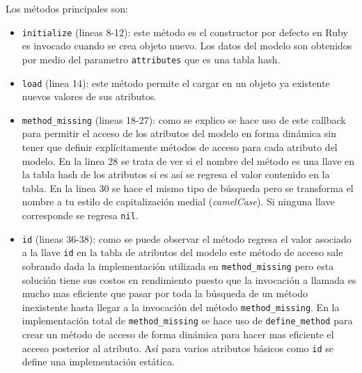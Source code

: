 Los métodos principales son:
\begin{itemize}
\item \texttt{initialize} (lineas 8-12): este método es el constructor por defecto
  en Ruby es invocado cuando se crea objeto nuevo. Los datos del modelo son obtenidos
  por medio del parametro \texttt{attributes} que es una tabla hash.
\item \texttt{load} (linea 14): este método permite el cargar en un objeto ya
  existente nuevos valores de sus atributos.
\item \texttt{method\_missing} (lineas 18-27): como se explico se hace uso de este
  callback para permitir el acceso de los atributos del modelo en forma dinámica sin
  tener que definir explícitamente métodos de acceso para cada atributo del modelo.
  En la linea 28 se trata de ver si el nombre del método es una llave en la tabla
  hash de los atributos si es así se regresa el valor contenido en la tabla.
  En la linea 30 se hace el mismo tipo de búsqueda pero se transforma el
  nombre a tu estilo de capitalización medial (\textit{camelCase}).
  Si ninguna llave corresponde se regresa \texttt{nil}.
\item \texttt{id} (lineas 36-38): como se puede observar el método regresa
  el valor asociado a la llave \texttt{id} en la tabla de atributos del modelo
  este método de acceso sale sobrando dada la implementación utilizada
  en \texttt{method\_missing} pero esta solución tiene sus costos en rendimiento
  puesto que la invocación a llamada es mucho mas eficiente que pasar por toda
  la búsqueda de un método inexistente hasta llegar a la invocación del método
  \texttt{method\_missing}. En la implementación total de \texttt{method\_missing}
  se hace uso de \texttt{define\_method} para crear un método de acceso
  de forma dinámica para hacer mas eficiente el acceso posterior al atributo.
  Así para varios atributos básicos como \texttt{id} se define una implementación
  estática.
\end{itemize}


%


%


%
